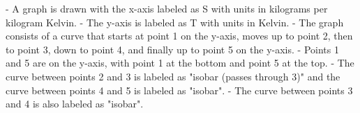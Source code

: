 - A graph is drawn with the x-axis labeled as S with units in kilograms per kilogram Kelvin.
- The y-axis is labeled as T with units in Kelvin.
- The graph consists of a curve that starts at point 1 on the y-axis, moves up to point 2, then to point 3, down to point 4, and finally up to point 5 on the y-axis.
- Points 1 and 5 are on the y-axis, with point 1 at the bottom and point 5 at the top.
- The curve between points 2 and 3 is labeled as "isobar (passes through 3)" and the curve between points 4 and 5 is labeled as "isobar".
- The curve between points 3 and 4 is also labeled as "isobar".